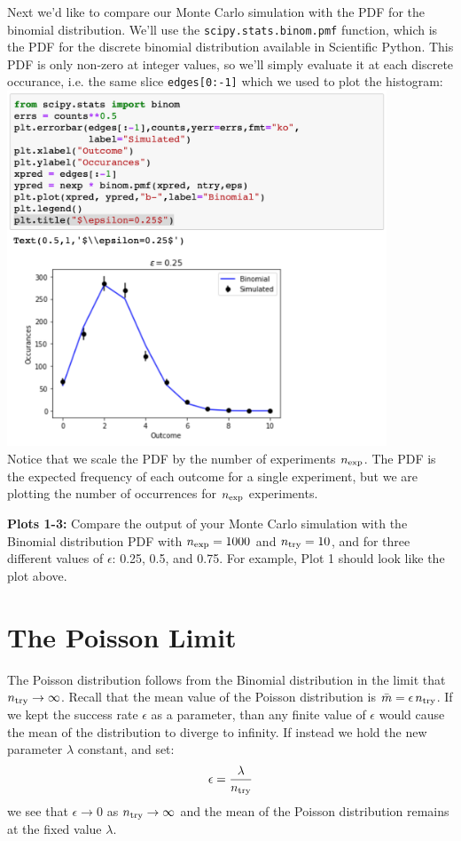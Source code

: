 Next we'd like to compare our Monte Carlo simulation with the PDF for
the binomial distribution.  We'll use the {\tt scipy.stats.binom.pmf}
function, which is the PDF for the discrete binomial distribution
available in Scientific Python.  This PDF is only non-zero at integer
values, so we'll simply evaluate it at each discrete occurance,
i.e. the same slice {\tt edges[0:-1]} which we used to plot the
histogram:\\
\includegraphics[width=0.85\textwidth]{figs/labs/distributions/compare.png}
\\ Notice that we scale the PDF by the number of experiments $n_{\rm
  exp}$.  The PDF is the expected frequency of each outcome for a
single experiment, but we are plotting the number of occurrences for
$n_{\rm exp}$ experiments.

{\bf Plots 1-3:} Compare the output of your Monte Carlo simulation
with the Binomial distribution PDF with $n_{\rm exp} = 1000$ and
$n_{\rm try} = 10$, and for three different values of $\epsilon$:
0.25, 0.5, and 0.75.  For example, Plot 1 should look like the plot above.


\section{The Poisson Limit}

The Poisson distribution follows from the Binomial distribution in the
limit that $n_{\rm try} \to \infty$.  Recall that the mean value of
the Poisson distribution is $\bar{m} = \epsilon \, n_{\rm try}$.  If
we kept the success rate $\epsilon$ as a parameter, than any finite
value of $\epsilon$ would cause the mean of the distribution to diverge to infinity.
If instead we hold the new parameter $\lambda$ constant, and set:
\begin{displaymath}
\epsilon = \frac{\lambda}{n_{\rm try}}
\end{displaymath}
we see that $\epsilon \to 0$ as $n_{\rm try} \to \infty$ and the mean
of the Poisson distribution remains at the fixed value $\lambda$.

